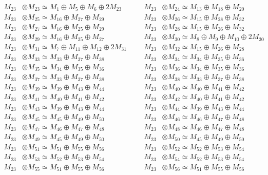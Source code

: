 \begin{align*}
M_{23} &\otimes M_{23} \simeq M_{1} \oplus M_{5} \oplus M_{6} \oplus 2M_{23} &&& M_{23} &\otimes M_{24} \simeq M_{13} \oplus M_{18} \oplus M_{20}\\
M_{23} &\otimes M_{25} \simeq M_{16} \oplus M_{27} \oplus M_{29} &&& M_{23} &\otimes M_{26} \simeq M_{15} \oplus M_{28} \oplus M_{32}\\
M_{23} &\otimes M_{27} \simeq M_{16} \oplus M_{25} \oplus M_{29} &&& M_{23} &\otimes M_{28} \simeq M_{15} \oplus M_{26} \oplus M_{32}\\
M_{23} &\otimes M_{29} \simeq M_{16} \oplus M_{25} \oplus M_{27} &&& M_{23} &\otimes M_{30} \simeq M_{8} \oplus M_{9} \oplus M_{10} \oplus 2M_{30}\\
M_{23} &\otimes M_{31} \simeq M_{7} \oplus M_{11} \oplus M_{12} \oplus 2M_{31} &&& M_{23} &\otimes M_{32} \simeq M_{15} \oplus M_{26} \oplus M_{28}\\
M_{23} &\otimes M_{33} \simeq M_{33} \oplus M_{37} \oplus M_{38} &&& M_{23} &\otimes M_{34} \simeq M_{34} \oplus M_{35} \oplus M_{36}\\
M_{23} &\otimes M_{35} \simeq M_{34} \oplus M_{35} \oplus M_{36} &&& M_{23} &\otimes M_{36} \simeq M_{34} \oplus M_{35} \oplus M_{36}\\
M_{23} &\otimes M_{37} \simeq M_{33} \oplus M_{37} \oplus M_{38} &&& M_{23} &\otimes M_{38} \simeq M_{33} \oplus M_{37} \oplus M_{38}\\
M_{23} &\otimes M_{39} \simeq M_{39} \oplus M_{43} \oplus M_{44} &&& M_{23} &\otimes M_{40} \simeq M_{40} \oplus M_{41} \oplus M_{42}\\
M_{23} &\otimes M_{41} \simeq M_{40} \oplus M_{41} \oplus M_{42} &&& M_{23} &\otimes M_{42} \simeq M_{40} \oplus M_{41} \oplus M_{42}\\
M_{23} &\otimes M_{43} \simeq M_{39} \oplus M_{43} \oplus M_{44} &&& M_{23} &\otimes M_{44} \simeq M_{39} \oplus M_{43} \oplus M_{44}\\
M_{23} &\otimes M_{45} \simeq M_{45} \oplus M_{49} \oplus M_{50} &&& M_{23} &\otimes M_{46} \simeq M_{46} \oplus M_{47} \oplus M_{48}\\
M_{23} &\otimes M_{47} \simeq M_{46} \oplus M_{47} \oplus M_{48} &&& M_{23} &\otimes M_{48} \simeq M_{46} \oplus M_{47} \oplus M_{48}\\
M_{23} &\otimes M_{49} \simeq M_{45} \oplus M_{49} \oplus M_{50} &&& M_{23} &\otimes M_{50} \simeq M_{45} \oplus M_{49} \oplus M_{50}\\
M_{23} &\otimes M_{51} \simeq M_{51} \oplus M_{55} \oplus M_{56} &&& M_{23} &\otimes M_{52} \simeq M_{52} \oplus M_{53} \oplus M_{54}\\
M_{23} &\otimes M_{53} \simeq M_{52} \oplus M_{53} \oplus M_{54} &&& M_{23} &\otimes M_{54} \simeq M_{52} \oplus M_{53} \oplus M_{54}\\
M_{23} &\otimes M_{55} \simeq M_{51} \oplus M_{55} \oplus M_{56} &&& M_{23} &\otimes M_{56} \simeq M_{51} \oplus M_{55} \oplus M_{56}\\
\end{align*}

